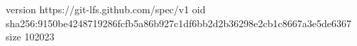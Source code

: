 version https://git-lfs.github.com/spec/v1
oid sha256:9150be4248719286fcfb5a86b927c1df6bb2d2b36298e2cb1c8667a3e5de6367
size 102023
